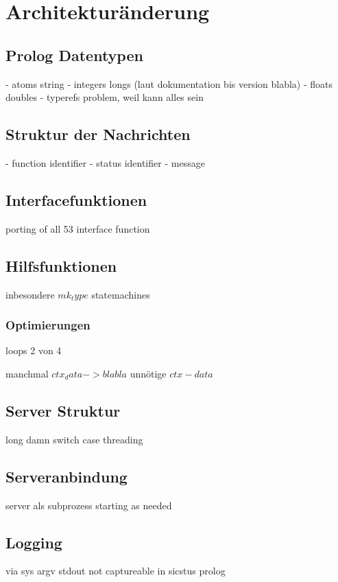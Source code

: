 


\section{Architekturänderung}

\subsection{Prolog Datentypen}

- atoms string
- integers longs (laut dokumentation bis version blabla)
- floats doubles
- typerefs problem, weil kann alles sein

\subsection{Struktur der Nachrichten}

- function identifier
- status identifier
- message


\subsection{Interfacefunktionen}

porting of all 53 interface function



\subsection{Hilfsfunktionen}

inbesondere $mk_type$
statemachines




\subsubsection{Optimierungen}

loops 2 von 4

manchmal $ctx_data -> blabla$ unnötige $ctx-data$


\subsection{Server Struktur}

long damn switch case
threading





\subsection{Serveranbindung}

server als subprozess
starting as needed

\subsection{Logging}

via sys argv
stdout not captureable in sicstus prolog



